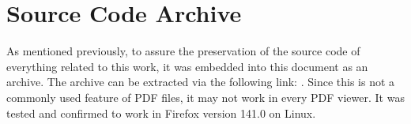 \documentclass[a4paper]{article}
\begin{document}
















\printbibliography

\appendix

\section{Source Code Archive}
As mentioned previously, to assure the preservation of the source code of everything related to this work, it was embedded into this document as an archive.
The archive can be extracted via the following link: .
Since this is not a commonly used feature of PDF files, it may not work in every PDF viewer.
It was tested and confirmed to work in Firefox version 141.0 on Linux.
\end{document}
